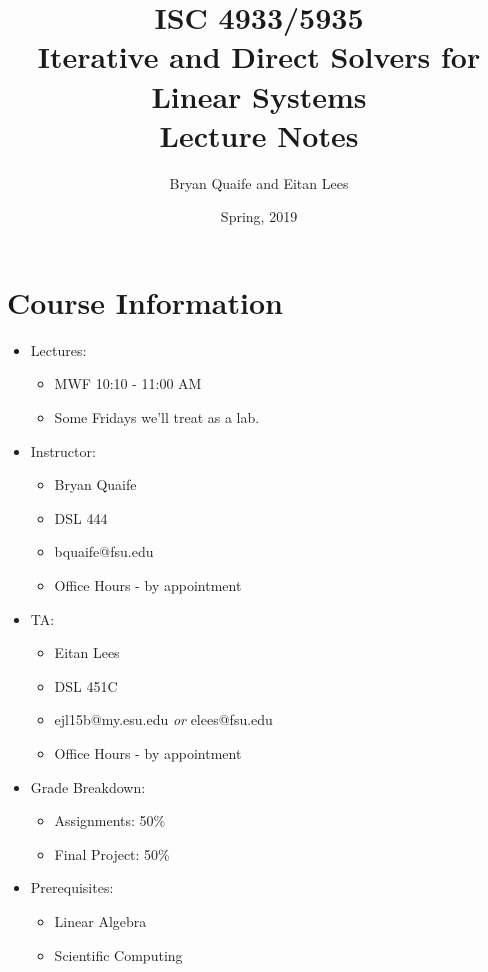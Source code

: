 \documentclass{article}
\title{ISC 4933/5935\\ 
Iterative and Direct Solvers for Linear Systems\\
Lecture Notes}
\author{Bryan Quaife and Eitan Lees}
\date{Spring, 2019}
\begin{document}
\maketitle

\section*{Course Information}

\begin{itemize}[label={}]
  \item Lectures:
    \begin{itemize}[label={}]
        \item MWF 10:10 - 11:00 AM
        \item Some Fridays we'll treat as a lab.
    \end{itemize}
    
  \item Instructor:
    \begin{itemize}[label={}]
        \item Bryan Quaife
        \item DSL 444
        \item bquaife@fsu.edu
        \item Office Hours - by appointment
    \end{itemize}
  
  \item TA:
    \begin{itemize}[label={}]
        \item Eitan Lees
        \item DSL 451C
        \item ejl15b@my.esu.edu \emph{or} elees@fsu.edu
        \item Office Hours - by appointment
    \end{itemize}
  
  \item Grade Breakdown:
    \begin{itemize}[label={}]
        \item Assignments: 50\%
        \item Final Project: 50\%
    \end{itemize}
    
  \item Prerequisites:
    \begin{itemize}[label={}]
        \item Linear Algebra
        \item Scientific Computing
    \end{itemize}
    

\end{itemize}
\end{document}
